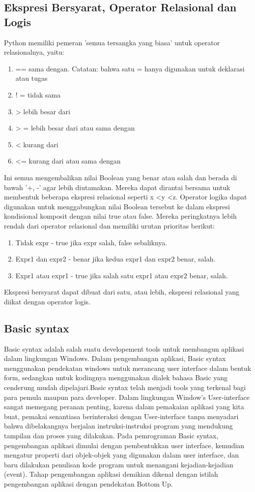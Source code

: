 \subsection{Ekspresi Bersyarat, Operator Relasional dan Logis}
Python memiliki pemeran 'semua tersangka yang biasa' untuk operator relasionalnya, yaitu: 
\begin{enumerate}
    \item ==	sama dengan. Catatan: bahwa satu = hanya digunakan untuk deklarasi atau tugas 
    \item ! = 	tidak sama 
    \item >  	lebih besar dari 
    \item > =	lebih besar dari atau sama dengan 
    \item < 	kurang dari 
    \item <= 	kurang dari atau sama dengan 
\end{enumerate}
Ini semua mengembalikan nilai Boolean yang benar atau salah dan berada di bawah '+, -' agar lebih diutamakan. Mereka dapat dirantai bersama untuk membentuk beberapa ekspresi relasional seperti x <y <z. Operator logika dapat digunakan untuk menggabungkan 
nilai Boolean tersebut ke dalam ekspresi kondisional komposit dengan nilai true atau false. Mereka peringkatnya 
lebih rendah dari operator relasional dan memiliki urutan prioritas berikut:
\begin{enumerate}
    \item Tidak expr - true jika expr salah, false sebaliknya. 
    \item Expr1 dan expr2 - benar jika kedua expr1 dan expr2 benar, salah. 
    \item Expr1 atau expr1 - true jika salah satu expr1 atau expr2 benar, salah. 
\end{enumerate}
Ekspresi bersyarat dapat dibuat dari satu, atau lebih, ekspresi relasional yang diikat dengan operator logis.


\subsection {Basic syntax}
Basic syntax adalah salah suatu developement tools untuk membangun aplikasi dalam lingkungan Windows. Dalam pengembangan aplikasi, Basic syntax menggunakan pendekatan windows untuk merancang user interface dalam bentuk form, sedangkan untuk kodingnya menggunakan dialek bahasa Basic yang cenderung mudah dipelajari.Basic syntax telah menjadi tools yang terkenal bagi para pemula maupun para developer. Dalam lingkungan Window’s User-interface sangat memegang peranan penting, karena dalam pemakaian aplikasi yang kita buat, pemakai senantiasa berinteraksi dengan User-interface tanpa menyadari bahwa dibelakangnya berjalan instruksi-instruksi program yang mendukung tampilan dan proses yang dilakukan.
Pada pemrograman Basic syntax, pengembangan aplikasi dimulai dengan pembentukkan user interface, kemudian mengatur properti dari objek-objek yang digunakan dalam user interface, dan baru dilakukan penulisan kode program untuk menangani kejadian-kejadian (event). Tahap pengembangan aplikasi demikian dikenal dengan istilah pengembangan aplikasi dengan pendekatan Bottom Up.

